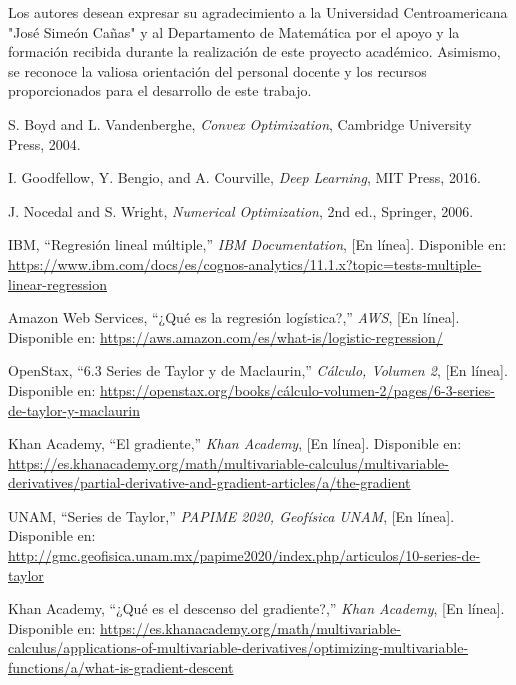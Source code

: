 \documentclass[12pt, letterpaper,conference]{IEEEtran}
\begin{document}
Los autores desean expresar su agradecimiento a la Universidad Centroamericana "José Simeón Cañas" y al Departamento de Matemática por el apoyo y la formación recibida durante la realización de este proyecto académico. Asimismo, se reconoce la valiosa orientación del personal docente y los recursos proporcionados para el desarrollo de este trabajo.


\vspace{0.25cm}

\begin{thebibliography}{1}

S. Boyd and L. Vandenberghe, \textit{Convex Optimization}, Cambridge University Press, 2004.

I. Goodfellow, Y. Bengio, and A. Courville, \textit{Deep Learning}, MIT Press, 2016.

J. Nocedal and S. Wright, \textit{Numerical Optimization}, 2nd ed., Springer, 2006.


IBM, ``Regresión lineal múltiple,'' \textit{IBM Documentation}, [En línea]. Disponible en: \url{https://www.ibm.com/docs/es/cognos-analytics/11.1.x?topic=tests-multiple-linear-regression}

Amazon Web Services, ``¿Qué es la regresión logística?,'' \textit{AWS}, [En línea]. Disponible en: \url{https://aws.amazon.com/es/what-is/logistic-regression/}

OpenStax, ``6.3 Series de Taylor y de Maclaurin,'' \textit{Cálculo, Volumen 2}, [En línea]. Disponible en: \url{https://openstax.org/books/cálculo-volumen-2/pages/6-3-series-de-taylor-y-maclaurin}

Khan Academy, ``El gradiente,'' \textit{Khan Academy}, [En línea]. Disponible en: \url{https://es.khanacademy.org/math/multivariable-calculus/multivariable-derivatives/partial-derivative-and-gradient-articles/a/the-gradient}

UNAM, ``Series de Taylor,'' \textit{PAPIME 2020, Geofísica UNAM}, [En línea]. Disponible en: \url{http://gmc.geofisica.unam.mx/papime2020/index.php/articulos/10-series-de-taylor}

Khan Academy, ``¿Qué es el descenso del gradiente?,'' \textit{Khan Academy}, [En línea]. Disponible en: \url{https://es.khanacademy.org/math/multivariable-calculus/applications-of-multivariable-derivatives/optimizing-multivariable-functions/a/what-is-gradient-descent}


\end{thebibliography}
\end{document}
